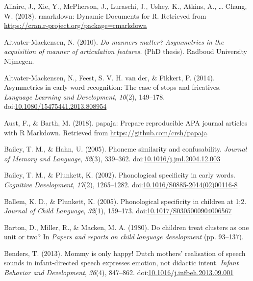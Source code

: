 \documentclass[man]{apa6}
\begin{document}
\begingroup
\setlength{\parindent}{-0.5in}
\setlength{\leftskip}{0.5in}

\hypertarget{refs}{}
\leavevmode\hypertarget{ref-RMarkdown}{}%
Allaire, J., Xie, Y., McPherson, J., Luraschi, J., Ushey, K., Atkins, A., \ldots{} Chang, W. (2018). rmarkdown: Dynamic Documents for R. Retrieved from \url{https://cran.r-project.org/package=rmarkdown}

\leavevmode\hypertarget{ref-Altvater2010}{}%
Altvater-Mackensen, N. (2010). \emph{Do manners matter? Asymmetries in the acquisition of manner of articulation features.} (PhD thesis). Radboud University Nijmegen.

\leavevmode\hypertarget{ref-Altvater2014}{}%
Altvater-Mackensen, N., Feest, S. V. H. van der, \& Fikkert, P. (2014). Asymmetries in early word recognition: The case of stops and fricatives. \emph{Language Learning and Development}, \emph{10}(2), 149--178. doi:\href{https://doi.org/10.1080/15475441.2013.808954}{10.1080/15475441.2013.808954}

\leavevmode\hypertarget{ref-papaja}{}%
Aust, F., \& Barth, M. (2018). papaja: Prepare reproducible APA journal articles with R Markdown. Retrieved from \url{https://github.com/crsh/papaja}

\leavevmode\hypertarget{ref-Bailey2005}{}%
Bailey, T. M., \& Hahn, U. (2005). Phoneme similarity and confusability. \emph{Journal of Memory and Language}, \emph{52}(3), 339--362. doi:\href{https://doi.org/10.1016/j.jml.2004.12.003}{10.1016/j.jml.2004.12.003}

\leavevmode\hypertarget{ref-Bailey2002}{}%
Bailey, T. M., \& Plunkett, K. (2002). Phonological specificity in early words. \emph{Cognitive Development}, \emph{17}(2), 1265--1282. doi:\href{https://doi.org/10.1016/S0885-2014(02)00116-8}{10.1016/S0885-2014(02)00116-8}

\leavevmode\hypertarget{ref-Ballem2005}{}%
Ballem, K. D., \& Plunkett, K. (2005). Phonological specificity in children at 1;2. \emph{Journal of Child Language}, \emph{32}(1), 159--173. doi:\href{https://doi.org/10.1017/S0305000904006567}{10.1017/S0305000904006567}

\leavevmode\hypertarget{ref-Barton1980}{}%
Barton, D., Miller, R., \& Macken, M. A. (1980). Do children treat clusters as one unit or two? In \emph{Papers and reports on child language development} (pp. 93--137).

\leavevmode\hypertarget{ref-Benders2013}{}%
Benders, T. (2013). Mommy is only happy! Dutch mothers' realisation of speech sounds in infant-directed speech expresses emotion, not didactic intent. \emph{Infant Behavior and Development}, \emph{36}(4), 847--862. doi:\href{https://doi.org/10.1016/j.infbeh.2013.09.001}{10.1016/j.infbeh.2013.09.001}
\end{document}
